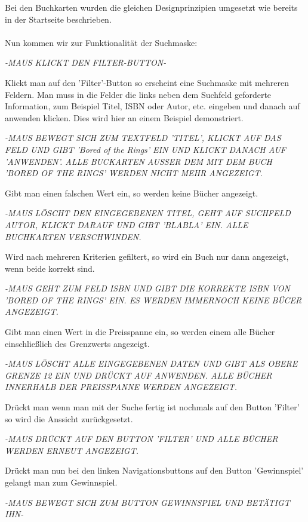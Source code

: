 \documentclass{article}
\begin{document}
Bei den Buchkarten wurden die gleichen Designprinzipien umgesetzt wie bereits in der Startseite beschrieben.\\
\\
Nun kommen wir zur Funktionalität der Suchmaske:
\begin{center}
\textit{-MAUS KLICKT DEN FILTER-BUTTON-}
\end{center}
Klickt man auf den 'Filter'-Button so erscheint eine Suchmaske mit mehreren Feldern. Man muss in die Felder die links neben dem Suchfeld geforderte Information, zum Beispiel Titel, ISBN oder Autor, etc. eingeben und danach auf anwenden klicken. Dies wird hier an einem Beispiel demonstriert.
\begin{center}
\textit{-MAUS BEWEGT SICH ZUM TEXTFELD 'TITEL', KLICKT AUF DAS FELD UND GIBT 'Bored of the Rings' EIN UND KLICKT DANACH AUF 'ANWENDEN'. ALLE BUCKARTEN AUSSER DEM MIT DEM BUCH 'BORED OF THE RINGS' WERDEN NICHT MEHR ANGEZEIGT.}
\end{center}
Gibt man einen falschen Wert ein, so werden keine Bücher angezeigt.
\begin{center}
\textit{-MAUS LÖSCHT DEN EINGEGEBENEN TITEL, GEHT AUF SUCHFELD AUTOR, KLICKT DARAUF UND GIBT 'BLABLA' EIN. ALLE BUCHKARTEN VERSCHWINDEN.}
\end{center}
Wird nach mehreren Kriterien gefiltert, so wird ein Buch nur dann angezeigt, wenn beide korrekt sind.
\begin{center}
\textit{-MAUS GEHT ZUM FELD ISBN UND GIBT DIE KORREKTE ISBN VON 'BORED OF THE RINGS' EIN. ES WERDEN IMMERNOCH KEINE BÜCER ANGEZEIGT.}
\end{center}
Gibt man einen Wert in die Preisspanne ein, so werden einem alle Bücher einschließlich des Grenzwerts angezeigt.
\begin{center}
\textit{-MAUS LÖSCHT ALLE EINGEGEBENEN DATEN UND GIBT ALS OBERE GRENZE 12 EIN UND DRÜCKT AUF ANWENDEN. ALLE BÜCHER INNERHALB DER PREISSPANNE WERDEN ANGEZEIGT.}
\end{center}
Drückt man wenn man mit der Suche fertig ist nochmals auf den Button 'Filter' so wird die Anssicht zurückgesetzt.
\begin{center}
\textit{-MAUS DRÜCKT AUF DEN BUTTON 'FILTER' UND ALLE BÜCHER WERDEN ERNEUT ANGEZEIGT.}
\end{center}
Drückt man nun bei den linken Navigationsbuttons auf den Button 'Gewinnspiel' gelangt man zum Gewinnspiel.
\begin{center}
\textit{-MAUS BEWEGT SICH ZUM BUTTON GEWINNSPIEL UND BETÄTIGT IHN-}
\end{center}
\end{document}
